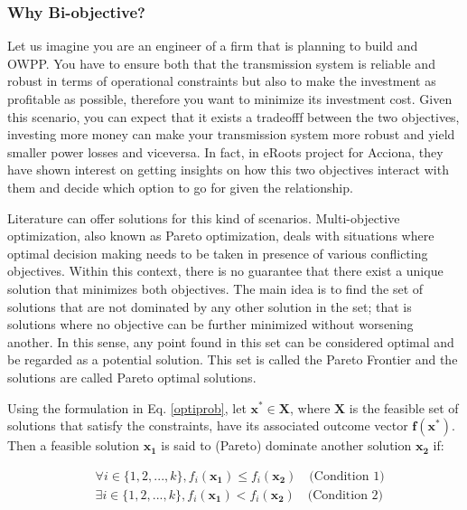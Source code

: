 \documentclass[a4paper,11pt, titlepage, twoside]{article}
\begin{document}
\subsubsection{Why Bi-objective?} \label{biobjective}

Let us imagine you are an engineer of a firm that is planning to build and OWPP. You have to ensure both that the transmission system is reliable and robust in terms of operational constraints but also to make the
investment as profitable as possible, therefore you want to minimize its investment cost. Given this scenario, you can expect that it exists a tradeofff between the two objectives, investing more money can make your transmission system more robust and yield smaller power losses and
viceversa. In fact, in eRoots project for Acciona, they have shown interest on getting insights on how this two objectives interact with them and decide which option to go for given the relationship.\par

Literature can offer solutions for this kind of scenarios. Multi-objective optimization, also known as Pareto optimization, deals with situations where optimal decision
making needs to be taken in presence of various conflicting objectives.  Within this context, there is no guarantee that there exist a unique solution that minimizes both objectives.
The main idea is to find the set of solutions that are not dominated by any other solution in the set; that is solutions where no objective can be further minimized without worsening another. In this sense, any point found in this set can be considered optimal 
and be regarded as a potential solution. This set is called the Pareto Frontier and the solutions are called Pareto optimal solutions.\par

Using the formulation in Eq. \ref{optiprob}, let $ \mathbf{x^*} \in \mathbf{X}$, where $\mathbf{X}$ is the feasible set of solutions that satisfy the constraints, have its associated outcome vector $\mathbf{f}(\mathbf{x^*})$.
Then a feasible solution $\mathbf{x_1}$ is said to (Pareto) dominate another solution $\mathbf{x_2}$ \cite{nsgai} if: 

\begin{equation} \label{paretodomination}
\begin{split}
    & \forall i \in \{1, 2, ..., k\}, f_i(\mathbf{x_1}) \leq f_i(\mathbf{x_2}) \quad \text{(Condition 1)} \\
    & \exists i \in \{1, 2, ..., k\}, f_i(\mathbf{x_1}) < f_i(\mathbf{x_2}) \quad \text{(Condition 2)}
\end{split}    
\end{equation}
\end{document}
